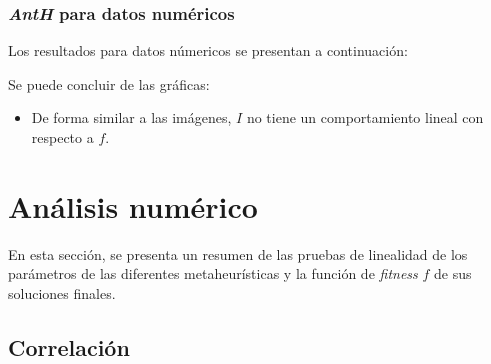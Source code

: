 \subsubsection{\emph{AntH} para datos numéricos}

    Los resultados para datos númericos se presentan a continuación:

\begin{figure}[H]
  \centering
  \label{fig:f_ant}
\end{figure}

    Se puede concluir de las gráficas:
\begin{itemize}
	\item De forma similar a las imágenes, $I$ no tiene un
comportamiento lineal con respecto a $f$.
\end{itemize}


\section{Análisis numérico}

    En esta sección, se presenta un resumen de las pruebas de linealidad de
los parámetros de las diferentes metaheurísticas y la función de \emph{fitness}
$f$ de sus soluciones finales.

\subsection{Correlación}

